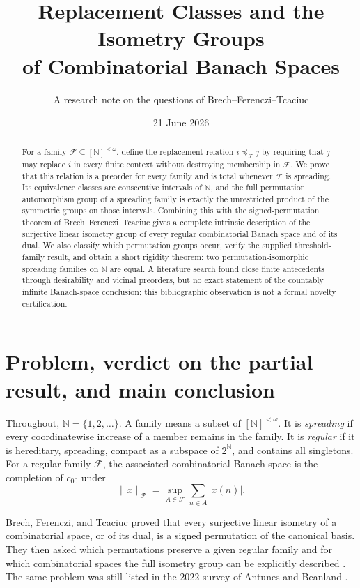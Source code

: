 \documentclass[11pt]{article}
\title{Replacement Classes and the Isometry Groups\\
of Combinatorial Banach Spaces}
\author{A research note on the questions of Brech--Ferenczi--Tcaciuc}
\date{21 June 2026}
\theoremstyle{definition}
\theoremstyle{remark}
\newcommand{\N}{\mathbb N}
\newcommand{\F}{\mathcal F}
\begin{document}
\maketitle

\begin{abstract}
For a family $\F\subseteq[\N]^{<\omega}$, define the replacement relation
$i\preccurlyeq_{\F}j$ by requiring that $j$ may replace $i$ in every finite
context without destroying membership in $\F$.  We prove that this relation
is a preorder for every family and is total whenever $\F$ is spreading.  Its
equivalence classes are consecutive intervals of $\N$, and the full
permutation automorphism group of a spreading family is exactly the
unrestricted product of the symmetric groups on those intervals.  Combining
this with the signed-permutation theorem of Brech--Ferenczi--Tcaciuc gives a
complete intrinsic description of the surjective linear isometry group of
every regular combinatorial Banach space and of its dual.  We also classify
which permutation groups occur, verify the supplied threshold-family result,
and obtain a short rigidity theorem: two permutation-isomorphic spreading
families on $\N$ are equal.  A literature search found close finite
antecedents through desirability and vicinal preorders, but no exact statement
of the countably infinite Banach-space conclusion; this bibliographic
observation is not a formal novelty certification.
\end{abstract}

\section{Problem, verdict on the partial result, and main conclusion}

Throughout, $\N=\{1,2,\ldots\}$.  A family means a subset of
$[\N]^{<\omega}$.  It is \emph{spreading} if every coordinatewise increase of
a member remains in the family.  It is \emph{regular} if it is hereditary,
spreading, compact as a subspace of $2^{\N}$, and contains all singletons.
For a regular family $\F$, the associated combinatorial Banach space is the
completion of $c_{00}$ under
\[
  \|x\|_{\F}=\sup_{A\in\F}\sum_{n\in A}|x(n)|.
\]

Brech, Ferenczi, and Tcaciuc proved that every surjective linear isometry of a
combinatorial space, or of its dual, is a signed permutation of the canonical
basis.  They then asked which permutations preserve a given regular family
and for which combinatorial spaces the full isometry group can be explicitly
described \cite{BFT}.  The same problem was still listed in the 2022 survey of
Antunes and Beanland \cite[Problem~3.1]{ABsurvey}.
\end{document}

